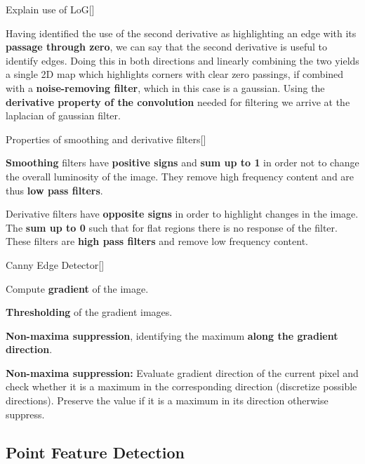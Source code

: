 \documentclass[10pt,a4paper]{scrartcl}
\begin{document}
\begin{multicols*}{2}
\begin{QandA}{Explain use of LoG}[\Application]
\item Having identified the use of the second derivative as highlighting an edge with its \textbf{passage through zero}, we can say that the second derivative is useful to identify edges. Doing this in both directions and linearly combining the two yields a single 2D map which highlights corners with clear zero passings, if combined with a \textbf{noise-removing filter}, which in this case is a gaussian. Using the \textbf{derivative property of the convolution} needed for filtering we arrive at the laplacian of gaussian filter.
\end{QandA}

\begin{QandA}{Properties of smoothing and derivative filters}[\Comparison]
\item \textbf{Smoothing} filters have \textbf{positive signs} and \textbf{sum up to 1} in order not to change the overall luminosity of the image. They remove high frequency content and are thus \textbf{low pass filters}.
\item Derivative filters have \textbf{opposite signs} in order to highlight changes in the image. The \textbf{sum up to 0} such that for flat regions there is no response of the filter. These filters are \textbf{high pass filters} and remove low frequency content.
\end{QandA}

\begin{QandA}{Canny Edge Detector}[\Derivation]
\item Compute \textbf{gradient} of the image.
\item \textbf{Thresholding} of the gradient images.
\item \textbf{Non-maxima suppression}, identifying the maximum \textbf{along the gradient direction}.
\item \textbf{Non-maxima suppression:} Evaluate gradient direction of the current pixel and check whether it is a maximum in the corresponding direction (discretize possible directions). Preserve the value if it is a maximum in its direction otherwise suppress.
\end{QandA}

\subsection*{Point Feature Detection}


\end{multicols*}
\end{document}
